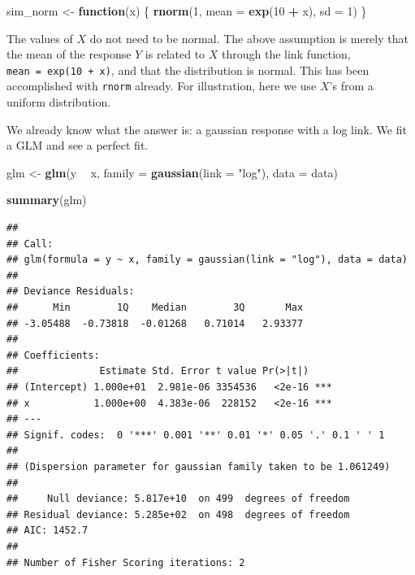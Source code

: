 \documentclass[openany]{book}
\newenvironment{Shaded}{\begin{snugshade}}{\end{snugshade}}
\newcommand{\ControlFlowTok}[1]{\textcolor[rgb]{0.13,0.29,0.53}{\textbf{#1}}}
\newcommand{\DataTypeTok}[1]{\textcolor[rgb]{0.13,0.29,0.53}{#1}}
\newcommand{\DecValTok}[1]{\textcolor[rgb]{0.00,0.00,0.81}{#1}}
\newcommand{\KeywordTok}[1]{\textcolor[rgb]{0.13,0.29,0.53}{\textbf{#1}}}
\newcommand{\NormalTok}[1]{#1}
\newcommand{\OperatorTok}[1]{\textcolor[rgb]{0.81,0.36,0.00}{\textbf{#1}}}
\newcommand{\StringTok}[1]{\textcolor[rgb]{0.31,0.60,0.02}{#1}}
\begin{document}
\begin{Shaded}
\begin{Highlighting}[]
\NormalTok{sim_norm <-}\StringTok{ }\ControlFlowTok{function}\NormalTok{(x) \{}
  \KeywordTok{rnorm}\NormalTok{(}\DecValTok{1}\NormalTok{, }\DataTypeTok{mean =} \KeywordTok{exp}\NormalTok{(}\DecValTok{10} \OperatorTok{+}\StringTok{ }\NormalTok{x), }\DataTypeTok{sd =} \DecValTok{1}\NormalTok{)}
\NormalTok{\}}
\end{Highlighting}
\end{Shaded}

The values of \(X\) do not need to be normal. The above assumption is merely that the mean of the response \(Y\) is related to \(X\) through the link function, \texttt{mean\ =\ exp(10\ +\ x)}, and that the distribution is normal. This has been accomplished with \texttt{rnorm} already. For illustration, here we use \(X\)'s from a uniform distribution.

\begin{Shaded}
\end{Shaded}

We already know what the answer is: a gaussian response with a log link. We fit a GLM and see a perfect fit.

\begin{Shaded}
\begin{Highlighting}[]
\NormalTok{glm <-}\StringTok{ }\KeywordTok{glm}\NormalTok{(y }\OperatorTok{~}\StringTok{ }\NormalTok{x, }\DataTypeTok{family =} \KeywordTok{gaussian}\NormalTok{(}\DataTypeTok{link =} \StringTok{"log"}\NormalTok{), }\DataTypeTok{data =}\NormalTok{ data)}

\KeywordTok{summary}\NormalTok{(glm)}
\end{Highlighting}
\end{Shaded}

\begin{verbatim}
## 
## Call:
## glm(formula = y ~ x, family = gaussian(link = "log"), data = data)
## 
## Deviance Residuals: 
##      Min        1Q    Median        3Q       Max  
## -3.05488  -0.73818  -0.01268   0.71014   2.93377  
## 
## Coefficients:
##              Estimate Std. Error t value Pr(>|t|)    
## (Intercept) 1.000e+01  2.981e-06 3354536   <2e-16 ***
## x           1.000e+00  4.383e-06  228152   <2e-16 ***
## ---
## Signif. codes:  0 '***' 0.001 '**' 0.01 '*' 0.05 '.' 0.1 ' ' 1
## 
## (Dispersion parameter for gaussian family taken to be 1.061249)
## 
##     Null deviance: 5.817e+10  on 499  degrees of freedom
## Residual deviance: 5.285e+02  on 498  degrees of freedom
## AIC: 1452.7
## 
## Number of Fisher Scoring iterations: 2
\end{verbatim}
\end{document}
